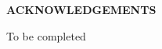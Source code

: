 \documentclass[12pt]{report}
\begin{document}
\setcounter{page}{2}

\newpage

\mbox{}

\newpage
\begin{center} \textbf{\large ACKNOWLEDGEMENTS} \end{center}
\bigskip
\noindent
To be completed

\newpage

\singlespacing

\tableofcontents

\setcounter{tocdepth}{2}

\listoftables

\listoffigures

\newpage
\renewcommand{\nomname}{Notation}
\printnomenclature

\newpage
{}



\newpage
\printbibliography

\appendix

\end{document}
